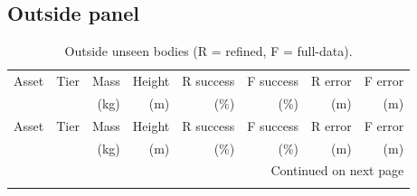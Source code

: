 \subsection{Outside panel}
\begingroup\scriptsize
\setlength{\tabcolsep}{4pt}
\begin{longtable}{lrrrrrrr}
\caption{Outside unseen bodies (R = refined, F = full-data).}\label{tab:all_outside}\\
\toprule
Asset & Tier & Mass & Height & R success & F success & R error & F error \\
 & & (kg) & (m) & (\%) & (\%) & (m) & (m) \\
\midrule\endfirsthead
\toprule
Asset & Tier & Mass & Height & R success & F success & R error & F error \\
 & & (kg) & (m) & (\%) & (\%) & (m) & (m) \\
\midrule\endhead
\midrule\multicolumn{8}{r}{Continued on next page}\\\endfoot
\bottomrule\endlastfoot


\end{longtable}
